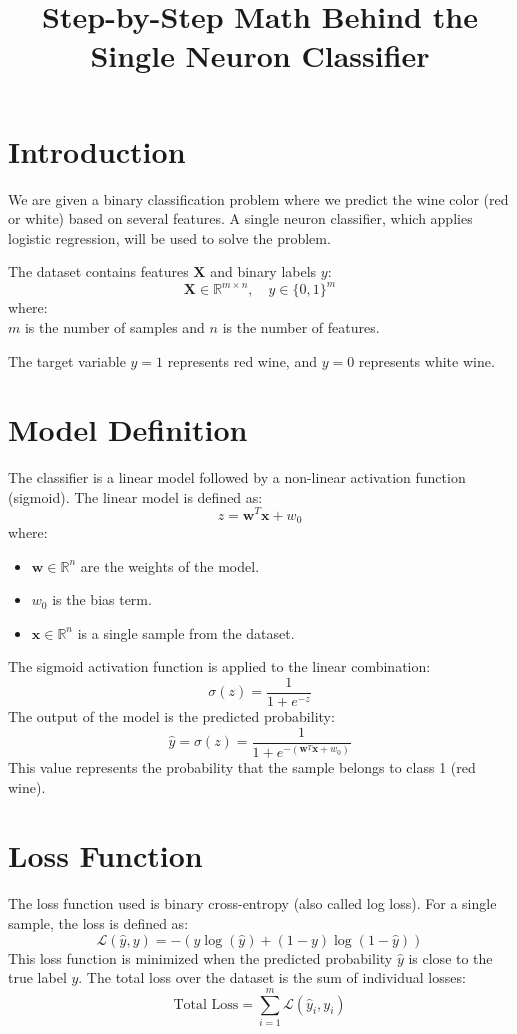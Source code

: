 \documentclass{article}
\title{Step-by-Step Math Behind the Single Neuron Classifier}
\author{}
\date{}
\begin{document}
\maketitle

\section{Introduction}
We are given a binary classification problem where we predict the wine color (red or white) based on several features. A single neuron classifier, which applies logistic regression, will be used to solve the problem.

The dataset contains features $\mathbf{X}$ and binary labels $y$:
\[
\mathbf{X} \in \mathbb{R}^{m \times n}, \quad y \in \{0, 1\}^{m}
\]
where: \\

$m$ is the number of samples and $n$ is the number of features. 

The target variable $y = 1$ represents red wine, and $y = 0$ represents white wine.

\section{Model Definition}

The classifier is a linear model followed by a non-linear activation function (sigmoid). The linear model is defined as:
\[
z = \mathbf{w}^T \mathbf{x} + w_0
\]
where:
\begin{itemize}
    \item $\mathbf{w} \in \mathbb{R}^n$ are the weights of the model.
    \item $w_0$ is the bias term.
    \item $\mathbf{x} \in \mathbb{R}^n$ is a single sample from the dataset.
\end{itemize}

The sigmoid activation function is applied to the linear combination:
\[
\sigma(z) = \frac{1}{1 + e^{-z}}
\]
The output of the model is the predicted probability:
\[
\hat{y} = \sigma(z) = \frac{1}{1 + e^{-(\mathbf{w}^T \mathbf{x} + w_0)}}
\]
This value represents the probability that the sample belongs to class 1 (red wine).

\section{Loss Function}

The loss function used is binary cross-entropy (also called log loss). For a single sample, the loss is defined as:
\[
\mathcal{L}(\hat{y}, y) = - \left( y \log(\hat{y}) + (1 - y) \log(1 - \hat{y}) \right)
\]
This loss function is minimized when the predicted probability $\hat{y}$ is close to the true label $y$. The total loss over the dataset is the sum of individual losses:
\[
\text{Total Loss} = \sum_{i=1}^{m} \mathcal{L}(\hat{y}_i, y_i)
\]
\end{document}
